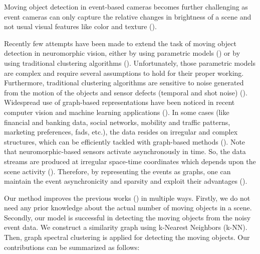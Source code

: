 \documentclass{article}
\begin{document}
Moving object detection in event-based cameras becomes further challenging as event cameras can only capture the relative changes in brightness of a scene and not usual visual features like color and texture (\cite{pikatkowska2012spatiotemporal}). 

Recently few attempts have been made to extend the task of moving object detection in neuromorphic vision, either by using parametric models (\cite{mitrokhin2018event,stoffregen2019event}) or by using traditional clustering algorithms (\cite{pikatkowska2012spatiotemporal,hinz2017online,chen2018neuromorphic}). Unfortunately, those parametric models are complex and require several assumptions to hold for their proper working. Furthermore, traditional clustering algorithms are sensitive to noise generated from the motion of the objects and sensor defects (temporal and shot noise) (\cite{chen2020event}).
Widespread use of graph-based representations have been noticed in recent computer vision and machine learning applications (\cite{giraldo2020graph,giraldo2021graphbgs,xia2021graph}). In some cases (like financial and banking data, social networks, mobility and traffic patterns, marketing preferences, fads, etc.), the data resides on irregular and complex structures, which can be efficiently tackled with graph-based methods (\cite{ortega2018graph}). Note that neuromorphic-based sensors activate asynchronously in time. So, the data streams are produced at irregular space-time coordinates which depends upon the scene activity (\cite{bi2020graph}). Therefore, by representing the events as graphs, one can maintain the event asynchronicity and sparsity and exploit their advantages (\cite{bi2020graph}).

Our method improves the previous works (\cite{pikatkowska2012spatiotemporal,chen2018neuromorphic,hinz2017online}) in multiple ways. Firstly, we do not need any prior knowledge about the actual number of moving objects in a scene. Secondly, our model is successful in detecting the moving objects from the noisy event data. We construct a similarity graph using k-Nearest Neighbors (k-NN). Then, graph spectral clustering is applied for detecting the moving objects. Our contributions can be summarized as follows:
\end{document}
